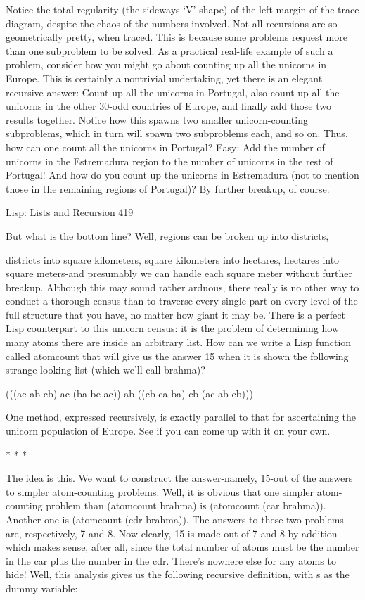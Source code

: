         Notice the total regularity (the sideways `V' shape) of the left margin of the
trace diagram, despite the chaos of the numbers involved. Not all recursions are so
geometrically pretty, when traced. This is because some problems request more than
one subproblem to be solved. As a practical real-life example of such a problem,
consider how you might go about counting up all the unicorns in Europe. This is
certainly a nontrivial undertaking, yet there is an elegant recursive answer: Count up
all the unicorns in Portugal, also count up all the unicorns in the other 30-odd
countries of Europe, and finally add those two results together.
        Notice how this spawns two smaller unicorn-counting subproblems, which in
turn will spawn two subproblems each, and so on. Thus, how can one count all the
unicorns in Portugal? Easy: Add the number of unicorns in the Estremadura region to
the number of unicorns in the rest of Portugal! And how do you count up the unicorns
in Estremadura (not to mention those in the remaining regions of Portugal)? By
further breakup, of course.




Lisp: Lists and Recursion                                                             419

But what is the bottom line? Well, regions can be broken up into districts,

        districts into square kilometers, square kilometers into hectares, hectares into
square meters-and presumably we can handle each square meter without further
breakup.
        Although this may sound rather arduous, there really is no other way to
conduct a thorough census than to traverse every single part on every level of the full
structure that you have, no matter how giant it may be. There is a perfect Lisp
counterpart to this unicorn census: it is the problem of determining how many atoms
there are inside an arbitrary list. How can we write a Lisp function called atomcount
that will give us the answer 15 when it is shown the following strange-looking list
(which we'll call brahma)?

       (((ac ab cb) ac (ba be ac)) ab ((cb ca ba) cb (ac ab cb)))

One method, expressed recursively, is exactly parallel to that for ascertaining the
unicorn population of Europe. See if you can come up with it on your own.

                                       *   *   *

       The idea is this. We want to construct the answer-namely, 15-out of the
answers to simpler atom-counting problems. Well, it is obvious that one simpler
atom-counting problem than (atomcount brahma) is (atomcount (car brahma)).
Another one is (atomcount (cdr brahma)). The answers to these two problems are,
respectively, 7 and 8. Now clearly, 15 is made out of 7 and 8 by addition-which
makes sense, after all, since the total number of atoms must be the number in the car
plus the number in the cdr. There's nowhere else for any atoms to hide! Well, this
analysis gives us the following recursive definition, with s as the dummy variable:

